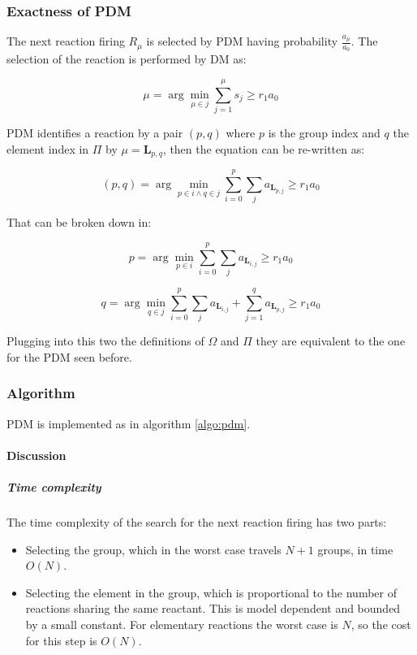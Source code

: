     \subsubsection{Exactness of PDM}
    The next reaction firing $R_\mu$ is selected by PDM having probability $\frac{a_\mu}{a_0}$.
    The selection of the reaction is performed by DM as:

    $$\mu = \arg\min\limits_{\mu\in j}\sum\limits_{j=1}^\mu s_j\ge r_1a_0$$

    PDM identifies a reaction by a pair $(p,q)$ where $p$ is the group index and $q$ the element index in $\Pi$ by $\mu = \mathbf{L}_{p,q}$, then the equation can be re-written as:

    $$(p,q) = \arg\min_{p\in i\land q\in j}\sum\limits_{i=0}^p\sum\limits_{j}a_{\mathbf{L}_{p,j}}\ge r_1 a_0$$

    That can be broken down in:

    $$p = \arg\min\limits_{p\in i}\sum\limits_{i=0}^p\sum\limits_j a_{\mathbf{L}_{i, j}}\ge r_1a_0$$

    $$q = \arg\min\limits_{q\in j}\sum\limits_{i=0}^p\sum\limits_j a_{\mathbf{L}_{i, j}} + \sum\limits_{j=1}^q a_{\mathbf{L}_{p,j}}\ge r_1 a_0$$

    Plugging into this two the definitions of $\Omega$ and $\Pi$ they are equivalent to the one for the PDM seen before.

    \subsubsection{Algorithm}
    PDM is implemented as in algorithm \ref{algo:pdm}.

    

      \paragraph{Discussion}

        \subparagraph{Time complexity}
        The time complexity of the search for the next reaction firing has two parts:

        \begin{multicols}{2}
          \begin{itemize}
            \item Selecting the group, which in the worst case travels $N+1$ groups, in time $O(N)$.
            \item Selecting the element in the group, which is proportional to the number of reactions sharing the same reactant.
              This is model dependent and bounded by a small constant.
              For elementary reactions the worst case is $N$, so the cost for this step is $O(N)$.
          \end{itemize}
        \end{multicols}

